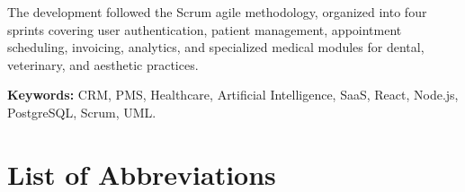 \documentclass[12pt,a4paper,oneside]{report}
\begin{document}
The development followed the Scrum agile methodology, organized into four sprints covering user authentication, patient management, appointment scheduling, invoicing, analytics, and specialized medical modules for dental, veterinary, and aesthetic practices.

\textbf{Keywords:} CRM, PMS, Healthcare, Artificial Intelligence, SaaS, React, Node.js, PostgreSQL, Scrum, UML.

\newpage

\tableofcontents
\newpage

\listoffigures
{}
\newpage

\listoftables
{}
\newpage

\chapter*{List of Abbreviations}
\end{document}
